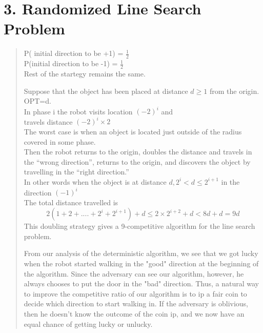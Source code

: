 \documentclass{article}
\newenvironment{subs}
  {\adjustwidth{3em}{0pt}}
  {\endadjustwidth}
\begin{document}
\section*{3.     Randomized Line Search Problem} 
\begin{subs}
	\begin{quote}
		P( initial direction to be +1) = $\frac{1}{2}$\\
		P(initial direction to be -1) = $\frac{1}{2}$\\
		Rest of the startegy remains the same.
		
		Suppose that the object has been placed at distance $d\geq 1$ from the origin.\\
		OPT=d.\\
		In phase i the robot visits location $(-2)^i$ and \\travels distance $(-2)^i \times 2$\\
		The worst case is when an object is located just outside of the radius covered in some phase.\\
		Then the robot returns to the origin, doubles the distance and travels in the “wrong direction”,
		 returns to the origin, and discovers the object by travelling in the “right direction.”\\
		In other words when the object is at distance $d, 2^i <d\leq2^{i+1} $ in the direction $(-1)^i$\\
		The total distance travelled is \\
		$$ 2(1+2+....+2^i+2^{i+1})+d \leq 2\times2^{i+2} +d<8d+d=9d$$
		This doubling strategy gives a 9-competitive algorithm for the line search problem.	
		\bigbreak

		From our analysis of the deterministic algorithm, we see that we got lucky when the robot started walking in
the "good" direction at the beginning of the algorithm. Since the adversary can see our algorithm, however,
he always chooses to put the door in the "bad" direction. Thus, a natural way to improve the competitive
ratio of our algorithm is to 
ip a fair coin to decide which direction to start walking in. If the adversary is
oblivious, then he doesn't know the outcome of the coin 
ip, and we now have an equal chance of getting
lucky or unlucky.
	\end{quote}

\begin{quote}
	

		
	     
\end{quote}




\end{subs}




\newpage
\end{document}

